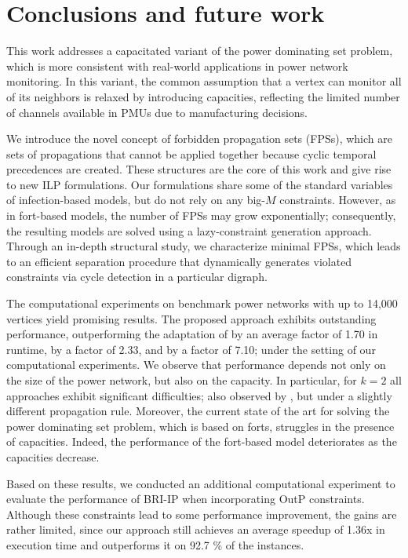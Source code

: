 \documentclass{article}
\newcommand{\BRIIP}{BRI-IP\xspace}
\begin{document}
\section{Conclusions and future work}\label{sec.conclusions.future.work}

This work addresses a capacitated variant of the power dominating set problem, which is more consistent with real-world applications in power network monitoring.
In this variant, the common assumption that a vertex can monitor all of its neighbors is relaxed by introducing capacities, reflecting the limited number of channels available in PMUs due to manufacturing decisions.

We introduce the novel concept of forbidden propagation sets (FPSs), which are sets of propagations that cannot be applied together because cyclic temporal precedences are created.
These structures are the core of this work and give rise to new ILP formulations.
Our formulations share some of the standard variables of infection-based models, but do not rely on any big-$M$ constraints. 
However, as in fort-based models, the number of FPSs may grow exponentially; consequently, the resulting models are solved using a lazy-constraint generation approach.
Through an in-depth structural study, we characterize minimal FPSs, which leads to an efficient separation procedure that dynamically generates violated constraints via cycle detection in a particular digraph.

The computational experiments on benchmark power networks with up to 14,000 vertices yield promising results.
The proposed approach exhibits outstanding performance, outperforming the adaptation of \citet{Brimkov2019} by an average factor of 1.70 in runtime,  \citet{Jovanovic2020} by a factor of 2.33, and \citet{Blasius2024} by a factor of 7.10; under the setting of our computational experiments.
We observe that performance depends not only on the size of the power network, but also on the capacity.
In particular, for $k=2$ all approaches exhibit significant difficulties; also observed by \citet{Carvalho2018}, but under a slightly different propagation rule.
Moreover, the current state of the art for solving the power dominating set problem, which is based on forts, struggles in the presence of capacities.
Indeed, the performance of the fort-based model deteriorates as the capacities decrease.

Based on these results, we conducted an additional computational experiment to evaluate the performance of \BRIIP when incorporating OutP constraints.
Although these constraints lead to some performance improvement, the gains are rather limited, since our approach still achieves an average speedup of 1.36x in execution time and outperforms it on 92.7 \% of the instances.
\end{document}
